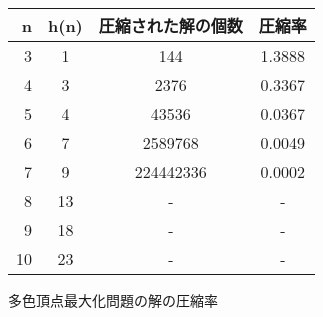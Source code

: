 \begin{tabular}{r|c|c|c}
 \hline
 n& h(n)& 圧縮された解の個数&圧縮率\\
 \hline
 3& 1   & 144       & 1.3888 \\
 4& 3   & 2376      & 0.3367 \\
 5& 4   & 43536     & 0.0367 \\
 6& 7   & 2589768   & 0.0049 \\
 7& 9   & 224442336 & 0.0002 \\
 8& 13  & -         & -      \\
 9& 18  & -         & -      \\
 10&23  & -         & -      \\
\end{tabular}
\caption{多色頂点最大化問題の解の圧縮率}
\label{table:com}